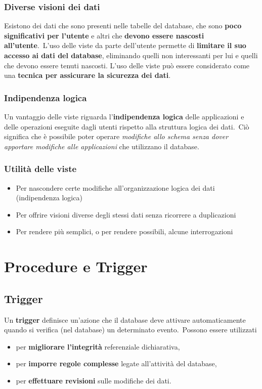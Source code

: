 \subsubsection{Diverse visioni dei dati}

Esistono dei dati che sono presenti nelle tabelle del database, che sono \textbf{poco significativi per l'utente} e altri che \textbf{devono essere nascosti all'utente}.\
L'uso delle viste da parte dell'utente permette di \textbf{limitare il suo accesso ai dati del database}, eliminando quelli non interessanti per lui e quelli che devono essere tenuti nascosti.
L'uso delle viste può essere considerato come una \textbf{tecnica per assicurare la sicurezza dei dati}.

\subsubsection{Indipendenza logica}

Un vantaggio delle viste riguarda l'\textbf{indipendenza logica} delle applicazioni e delle operazioni eseguite dagli utenti rispetto alla struttura logica dei dati.\
Ciò significa che è possibile poter operare \textit{modifiche allo schema senza dover apportare modifiche alle applicazioni} che utilizzano il database.

\subsubsection{Utilità delle viste}

\begin{itemize}
	\item Per nascondere certe modifiche all'organizzazione logica dei dati (indipendenza logica)
	\item Per offrire visioni diverse degli stessi dati senza ricorrere a duplicazioni
	\item Per rendere più semplici, o per rendere possibili, alcune interrogazioni
\end{itemize}

\section{Procedure e Trigger}

\subsection{Trigger}

Un \textbf{trigger} definisce un'azione che il database deve attivare automaticamente quando si verifica (nel database) un determinato evento.\
Possono essere utilizzati
\begin{itemize}
	\item per \textbf{migliorare l'integrità} referenziale dichiarativa,
	\item per \textbf{imporre regole complesse} legate all'attività del database,
	\item per \textbf{effettuare revisioni} sulle modifiche dei dati.
\end{itemize}

